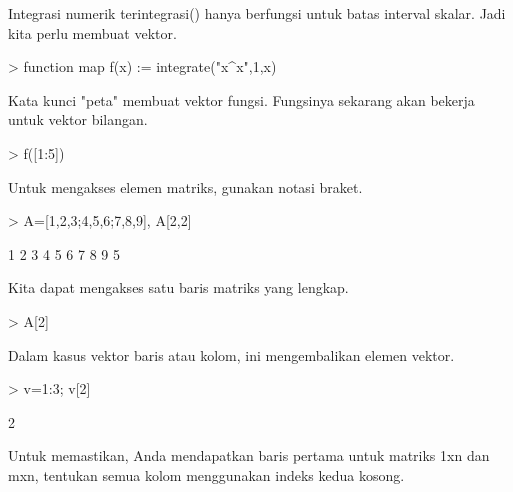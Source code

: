 \documentclass[a4paper,10pt]{article}
\begin{document}
\begin{eulernotebook}
\begin{eulercomment}
\begin{eulercomment}
\begin{eulercomment}
\begin{eulercomment}
\begin{eulercomment}
\begin{eulercomment}
\begin{eulercomment}
Integrasi numerik terintegrasi() hanya berfungsi untuk batas interval
skalar. Jadi kita perlu membuat vektor.
\end{eulercomment}
\begin{eulerprompt}
> function map f(x) := integrate("x^x",1,x)
\end{eulerprompt}
\begin{eulercomment}
Kata kunci "peta" membuat vektor fungsi. Fungsinya sekarang akan
bekerja\\
untuk vektor bilangan.
\end{eulercomment}
\begin{eulerprompt}
> f([1:5])
\end{eulerprompt}
\begin{euleroutput}
  [0,  2.05045,  13.7251,  113.336,  1241.03]
\end{euleroutput}
\begin{eulercomment}
Untuk mengakses elemen matriks, gunakan notasi braket.
\end{eulercomment}
\begin{eulerprompt}
> A=[1,2,3;4,5,6;7,8,9], A[2,2]
\end{eulerprompt}
\begin{euleroutput}
              1             2             3 
              4             5             6 
              7             8             9 
  5
\end{euleroutput}
\begin{eulercomment}
Kita dapat mengakses satu baris matriks yang lengkap.
\end{eulercomment}
\begin{eulerprompt}
> A[2]
\end{eulerprompt}
\begin{euleroutput}
  [4,  5,  6]
\end{euleroutput}
\begin{eulercomment}
Dalam kasus vektor baris atau kolom, ini mengembalikan elemen vektor.
\end{eulercomment}
\begin{eulerprompt}
> v=1:3; v[2]
\end{eulerprompt}
\begin{euleroutput}
  2
\end{euleroutput}
\begin{eulercomment}
Untuk memastikan, Anda mendapatkan baris pertama untuk matriks 1xn dan
mxn, tentukan semua kolom menggunakan indeks kedua kosong.
\end{eulercomment}

\end{eulercomment}
\end{eulercomment}
\end{eulercomment}
\end{eulercomment}
\end{eulercomment}
\end{eulercomment}
\end{eulernotebook}
\end{document}
